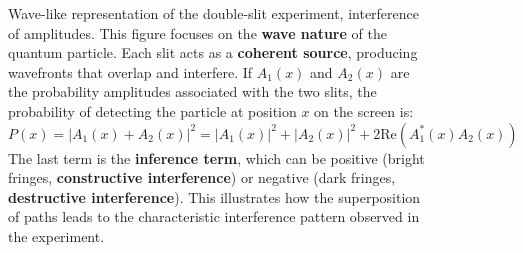 \begin{figure}[!htp]
{
    }
    \captionsetup{singlelinecheck=false}
    \caption[]{Wave-like representation of the double-slit experiment, interference of amplitudes. This figure focuses on the \textbf{wave nature} of the quantum particle. Each slit acts as a \textbf{coherent source}, producing wavefronts that overlap and interfere. If $A_{1}(x)$ and $A_{2}(x)$ are the probability amplitudes associated with the two slits, the probability of detecting the particle at position $x$ on the screen is:
    \begin{equation*}
        P(x) = \left|A_{1}(x) + A_{2}(x)\right|^2 = \left|A_{1}(x)\right|^2 + \left|A_{2}(x)\right|^2 + 2\text{Re}\left(A_{1}^{*}(x) A_{2}(x)\right)
    \end{equation*}
    The last term is the \textbf{inference term}, which can be positive (bright fringes, \textbf{constructive interference}) or negative (dark fringes, \textbf{destructive interference}). This illustrates how the superposition of paths leads to the characteristic interference pattern observed in the experiment.}
    \label{fig:double-slit-wave}
\end{figure}